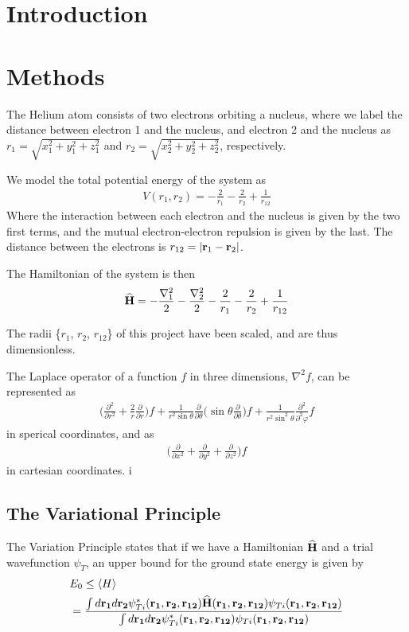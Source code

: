 \documentclass[twocolumn]{article}[12pt]
\newcommand{\eq}[1]{\begin{align*}#1\end{align*}}
\renewcommand\vec[1]{{\bf #1}}
\newcommand{\OP}[1]{{\bf\widehat{#1}}}
\begin{document}
\section{Introduction}

\section{Methods}

The Helium atom consists of two electrons orbiting a nucleus,
where we label the distance between electron 1 and the nucleus,
and electron 2 and the nucleus as
$r_1 = \sqrt{x_1^2 + y_1^2 + z_1^2}$ 
and $r_2 = \sqrt{x_2^2 + y_2^2 + z_2^2}$, respectively.

We model the total potential energy of the system as
{\small
\eq{
    V(r_1,r_2)=-\frac{2}{r_1}-\frac{2}{r_2}+\frac{1}{r_{12}}
}}%
Where the interaction between each electron and the nucleus
is given by the two first terms,
and the mutual electron-electron repulsion is given by the last.
The distance between the electrons is $r_{12}=|\vec r_1-\vec r_2|$.

The Hamiltonian of the system is then
{\small
\eq{
    \OP H = -\frac{\nabla_1 ^2}{2} -\frac{\nabla_2 ^2}{2}
    -\frac{2}{r_1}-\frac{2}{r_2}+\frac{1}{r_{12}}
}}%

The radii \{$r_1$, $r_2$, $r_{12}$\} 
of this project have been scaled, and are thus dimensionless.

The Laplace operator of a function $f$ in three dimensions, $\nabla^2 f$,
can be represented as
{\small
\eq{
  \bigg( \frac{\partial^2}{\partial r^2} 
    + \frac{2}{r} \frac{\partial}{\partial r} \bigg) f
    +\frac{1}{r^2 \sin\theta}\frac{\partial}{\partial \theta}
    \bigg( \sin\theta \frac{\partial}{\partial \theta}  \bigg) f
    +\frac{1}{r^2 \sin^2\theta}\frac{\partial^2}{\partial^2 \varphi} f
}}%
in sperical coordinates, and as
{\small
\eq{
	\bigg( 
	\frac{\partial}{\partial x^2} +
	\frac{\partial}{\partial y^2} +
	\frac{\partial}{\partial z^2}
	\bigg) f
}}%
in cartesian coordinates.
i
\subsection{The Variational Principle}
The Variation Principle states that if we have a Hamiltonian
$\OP H$ and a trial wavefunction $\psi_{T}$,
an upper bound for the ground state energy is given by
{\small
\eq{
	&E_0 \leq
	\langle H \rangle \\&=
	\frac{\int d{\bf r_1}d{\bf r_2}\psi^{\ast}_{Ti}({\bf r_1},{\bf r_2}, 
	{\bf r_{12}})
	\OP{H}({\bf r_1},{\bf r_2}, {\bf r_{12}})
	\psi_{Ti}({\bf r_1},{\bf r_2}, {\bf r_{12}})}
	{\int d{\bf r_1}d{\bf r_2}\psi^{\ast}_{Ti}({\bf r_1},{\bf r_2}, {\bf r_{12}})
	\psi_{Ti}({\bf r_1},{\bf r_2}, {\bf r_{12}})}
}}%
\end{document}
